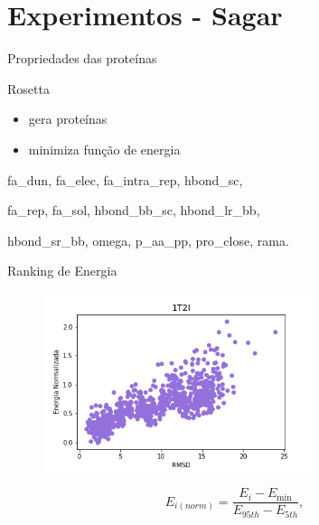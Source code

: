 \documentclass[10pt]{beamer}
\begin{document}
\section{Experimentos - Sagar}

\begin{frame}{Propriedades das proteínas}

\begin{block}{Rosetta}
    \begin{itemize}
        \item gera proteínas
        \item minimiza função de energia
    \end{itemize}
\end{block}

\begin{center}
    fa\_dun, fa\_elec, fa\_intra\_rep, hbond\_sc,

    fa\_rep, fa\_sol, hbond\_bb\_sc, hbond\_lr\_bb,

    hbond\_sr\_bb, omega, p\_aa\_pp, pro\_close, rama.
\end{center} 
\end{frame}


\begin{frame}{Ranking de Energia}
    \begin{figure}
        \centering
        \includegraphics[width=0.7\textwidth]{images/1t2i_tunnel.png}
    \end{figure}
    
    \begin{equation*}
        E_{i(norm)} = \frac{E_i - E_{\min}}{E_{95th} - E_{5th}},
    \end{equation*}
\end{frame}
\end{document}
